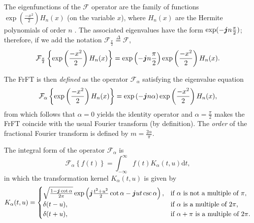 The eigenfunctions of the $\mathcal{F}$ operator are the family of functions $\exp (\frac{-x^2}{2}) H_n(x)$ (on the variable $x$), where $H_n(x)$ are the Hermite polynomials of order $n$ \cite{namias1980fractional}. The associated eigenvalues have the form $\exp(- \boldsymbol{j} n \frac{\pi}{2})$; therefore, if we add the notation $\mathcal{F}_{\frac{\pi}{2}} \overset{\Delta}{=} \mathcal{F}$,
\begin{equation}
\label{eq:eighermite}
\mathcal{F}_{\frac{\pi}{2}} \left\{ \exp \left(\frac{-x^2}{2}\right) H_n(x) \right\} = 
\exp\left(- \boldsymbol{j} n \frac{\pi}{2}\right)
\exp \left(\frac{-x^2}{2}\right) H_n(x).
\end{equation}

The FrFT is then \textit{defined} as the operator $\mathcal{F}_\alpha$ satisfying the eigenvalue equation
\begin{equation}
\label{eq:frftdef}
\mathcal{F}_{\alpha} \left\{ \exp \left(\frac{-x^2}{2}\right) H_n(x) \right\} = 
\exp\left(- \boldsymbol{j} n \alpha\right)
\exp \left(\frac{-x^2}{2}\right) H_n(x),
\end{equation}
from which follows that $\alpha = 0$ yields the identity operator and $\alpha = \frac{\pi}{2}$ makes the FrFT coincide with the usual Fourier transform (by definition). The \textit{order} of the fractional Fourier transform is defined by $m = \frac{2\alpha}{\pi}$.

The integral form of the operator $\mathcal{F}_\alpha$ is
\begin{equation}
\label{eq:integralfrft}
\mathcal{F}_\alpha \left\{ f(t) \right\} = \int_{-\infty}^{\infty} f(t) K_\alpha (t, u) \mathrm{d}t,
\end{equation}
in which the transformation kernel $K_\alpha (t, u)$ is given by
\begin{equation}
K_\alpha (t, u) = 
\begin{cases}
\sqrt{\frac{1 - \boldsymbol{j} \cot \alpha}{2\pi}} \exp \left( \boldsymbol{j} \frac{t^2 + u^2}{2} \cot \alpha - \boldsymbol{j} ut \csc \alpha\right), &
\text{if $\alpha$ is not a multiple of $\pi$,} \\
\delta (t - u), & \text{if $\alpha$ is a multiple of $2\pi$,} \\
\delta (t + u), & \text{if $\alpha + \pi$ is a multiple of $2\pi$.}
\end{cases}
\end{equation}

